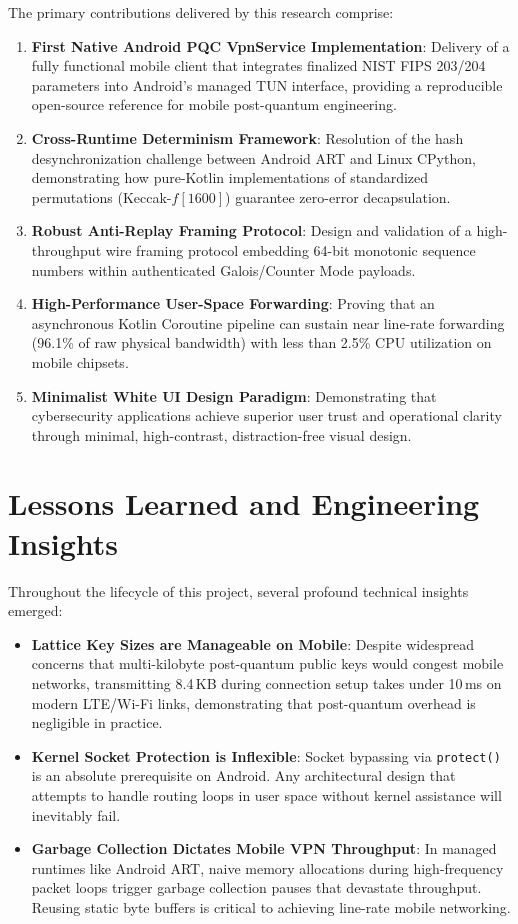 The primary contributions delivered by this research comprise:
\begin{enumerate}
    \item \textbf{First Native Android PQC VpnService Implementation}: Delivery of a fully functional mobile client that integrates finalized NIST FIPS 203/204 parameters into Android's managed TUN interface, providing a reproducible open-source reference for mobile post-quantum engineering.
    \item \textbf{Cross-Runtime Determinism Framework}: Resolution of the hash desynchronization challenge between Android ART and Linux CPython, demonstrating how pure-Kotlin implementations of standardized permutations (Keccak-$f[1600]$) guarantee zero-error decapsulation.
    \item \textbf{Robust Anti-Replay Framing Protocol}: Design and validation of a high-throughput wire framing protocol embedding 64-bit monotonic sequence numbers within authenticated Galois/Counter Mode payloads.
    \item \textbf{High-Performance User-Space Forwarding}: Proving that an asynchronous Kotlin Coroutine pipeline can sustain near line-rate forwarding (96.1\% of raw physical bandwidth) with less than 2.5\% CPU utilization on mobile chipsets.
    \item \textbf{Minimalist White UI Design Paradigm}: Demonstrating that cybersecurity applications achieve superior user trust and operational clarity through minimal, high-contrast, distraction-free visual design.
\end{enumerate}

\section{Lessons Learned and Engineering Insights}
\label{sec:lessons_learned}

Throughout the lifecycle of this project, several profound technical insights emerged:
\begin{itemize}
    \item \textbf{Lattice Key Sizes are Manageable on Mobile}: Despite widespread concerns that multi-kilobyte post-quantum public keys would congest mobile networks, transmitting 8.4\,KB during connection setup takes under 10\,ms on modern LTE/Wi-Fi links, demonstrating that post-quantum overhead is negligible in practice.
    \item \textbf{Kernel Socket Protection is Inflexible}: Socket bypassing via \texttt{protect()} is an absolute prerequisite on Android. Any architectural design that attempts to handle routing loops in user space without kernel assistance will inevitably fail.
    \item \textbf{Garbage Collection Dictates Mobile VPN Throughput}: In managed runtimes like Android ART, naive memory allocations during high-frequency packet loops trigger garbage collection pauses that devastate throughput. Reusing static byte buffers is critical to achieving line-rate mobile networking.
\end{itemize}

